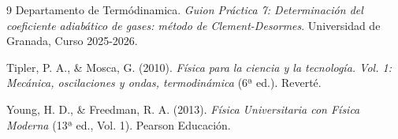 \documentclass[11pt, a4paper]{article}
\begin{document}
\begin{thebibliography}{9}
Departamento de Termódinamica. \textit{Guion Práctica 7: Determinación del coeficiente adiabático de gases: método de Clement-Desormes}. Universidad de Granada, Curso 2025-2026.

Tipler, P. A., \& Mosca, G. (2010). \textit{Física para la ciencia y la tecnología. Vol. 1: Mecánica, oscilaciones y ondas, termodinámica} (6ª ed.). Reverté.

Young, H. D., \& Freedman, R. A. (2013). \textit{Física Universitaria con Física Moderna} (13ª ed., Vol. 1). Pearson Educación.

\end{thebibliography}
\end{document}
